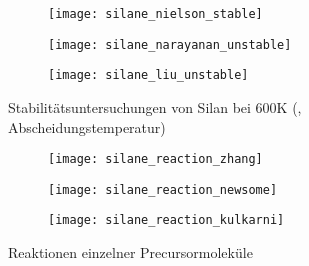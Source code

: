 \begin{figure}

  \captionsetup[subfigure]{singlelinecheck=false}
  \def\subfigwidth{0.32\textwidth}
  \begin{subfigure}[t]{3.5cm}
    \texttt{[image: silane\_nielson\_stable]}
  \end{subfigure}
  \hfill
  \begin{subfigure}[t]{4.5cm}
    \texttt{[image: silane\_narayanan\_unstable]}
  \end{subfigure}
  \hfill
  \begin{subfigure}[t]{5cm}
    \texttt{[image: silane\_liu\_unstable]}
  \end{subfigure}

  \caption[Stabilität von Silan]{Stabilitätsuntersuchungen von Silan bei 600K (, Abscheidungstemperatur)}
  \label{fig:silanestability}

\end{figure}

\begin{figure}

  \captionsetup[subfigure]{singlelinecheck=false}
  \def\subfigwidth{0.32\textwidth}
  \begin{subfigure}[t]{3cm}
    \texttt{[image: silane\_reaction\_zhang]}
  \end{subfigure}
  \hfill
  \begin{subfigure}[t]{5cm}
    \texttt{[image: silane\_reaction\_newsome]}
  \end{subfigure}
  \hfill
  \begin{subfigure}[t]{4.5cm}
    \texttt{[image: silane\_reaction\_kulkarni]}
  \end{subfigure}


  \caption[Reaktionen von Precursormolekülen]{Reaktionen einzelner Precursormoleküle}
  \label{fig:precursorreactions}

\end{figure}

